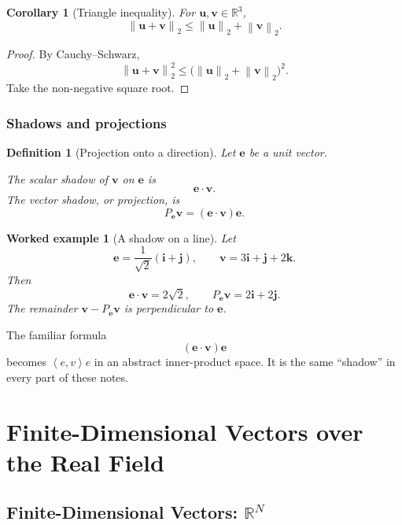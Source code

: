 \documentclass[11pt,a5paper,oneside,openany]{scrreprt}
\theoremstyle{notes}
\newtheorem{corollary}[theorem]{Corollary}
\theoremstyle{definitions}
\newtheorem{definition}[theorem]{Definition}
\newtheorem{example}[theorem]{Worked example}
\newcommand{\R}{\mathbb{R}}
\newcommand{\ip}[2]{\left\langle #1,#2\right\rangle}
\newcommand{\norm}[1]{\left\lVert #1\right\rVert}
\begin{document}
\begin{corollary}[Triangle inequality]
For $\mathbf u,\mathbf v\in\R^3$,
\[
  \norm{\mathbf u+\mathbf v}_2
  \le \norm{\mathbf u}_2+\norm{\mathbf v}_2.
\]
\end{corollary}

\begin{proof}
By Cauchy--Schwarz,
\[
 \norm{\mathbf u+\mathbf v}_2^2
 \le \bigl(\norm{\mathbf u}_2+\norm{\mathbf v}_2\bigr)^2.
\]
Take the non-negative square root.
\end{proof}

\section{Shadows and projections}

\begin{definition}[Projection onto a direction]
Let $\mathbf e$ be a unit vector.

The scalar shadow of $\mathbf v$ on $\mathbf e$ is
\[
  \mathbf e\cdot\mathbf v.
\]
The vector shadow, or projection, is
\[
  \boxed{P_{\mathbf e}\mathbf v
  =(\mathbf e\cdot\mathbf v)\mathbf e}.
\]
\end{definition}

\begin{example}[A shadow on a line]
Let
\[
  \mathbf e=\frac1{\sqrt2}(\mathbf i+\mathbf j),
  \qquad
  \mathbf v=3\mathbf i+\mathbf j+2\mathbf k.
\]
Then
\[
  \mathbf e\cdot\mathbf v=2\sqrt2,
  \qquad
  P_{\mathbf e}\mathbf v=2\mathbf i+2\mathbf j.
\]
The remainder $\mathbf v-P_{\mathbf e}\mathbf v$ is perpendicular to
$\mathbf e$.
\end{example}

\begin{bridge}
The familiar formula
\[
 (\mathbf e\cdot\mathbf v)\mathbf e
\]
becomes $\ip e v e$ in an abstract inner-product space.  It is the same
``shadow'' in every part of these notes.
\end{bridge}

\part{Finite-Dimensional Vectors over the Real Field}
\chapter{Finite-Dimensional Vectors: $\R^N$}
\label{part:finite}
\end{document}
